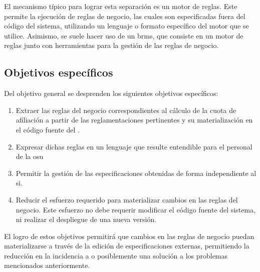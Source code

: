 El mecanismo típico para lograr esta separación es un motor de reglas. Este permite la ejecución de reglas de negocio, las cuales son especificadas fuera del código del sistema, utilizando un lenguaje o formato específico del motor que se utilice.
Asimismo, se suele hacer uso de un \acrfull{brms}, que consiste en un motor de reglas junto con herramientas para la gestión de las reglas de negocio.

\subsection{Objetivos específicos}\label{ssec:intro:especificos}

Del objetivo general se desprenden los siguientes objetivos específicos:
\begin{enumerate}
    \item \label{obj:esp:extraer}
    Extraer las reglas del negocio correspondientes al cálculo de la cuota de afiliación a partir de las reglamentaciones pertinentes y su materialización en el código fuente del {\SIDOSPU}.
    \item \label{obj:esp:intelegible}
    Expresar dichas reglas en un lenguaje que resulte entendible para el personal de la \acrlong{osu}
    \item \label{obj:esp:independiente}
    Permitir la gestión de las especificaciones obtenidas de forma independiente al \acrshort{si}.
    \item \label{obj:esp:esfuerzo}
    Reducir el esfuerzo requerido para materializar cambios en las reglas del negocio. Este esfuerzo no debe requerir modificar el código fuente del sistema, ni realizar el despliegue de una nueva versión.
\end{enumerate}

El logro de estos objetivos permitirá que cambios en las reglas de negocio puedan materializarse a través de la edición de especificaciones externas,  permitiendo la reducción en la incidencia a o posiblemente una solución a los problemas mencionados anteriormente.

